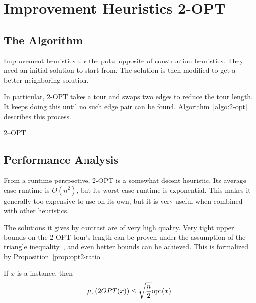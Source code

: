 \section{Improvement Heuristics 2-OPT}

\subsection{The Algorithm}

Improvement heuristics are the polar opposite of construction heuristics. They need an initial solution to start from. The solution is then modified to get a better neighboring solution.

In particular, 2-OPT takes a tour and swaps two edges to reduce the tour length. It keeps doing this until no such edge pair can be found. Algorithm~\ref{algo:2-opt} describes this process.

\begin{algorithm}
    \caption{2--OPT}
    \label{algo:2-opt}


\end{algorithm}

\subsection{Performance Analysis}

From a runtime perspective, 2-OPT is a somewhat decent heuristic. Its average case runtime is \(O(n^2)\), but its worst case runtime is exponential. This makes it generally too expensive to use on its own, but it is very useful when combined with other heuristics.

The solutions it gives by contrast are of very high quality. Very tight upper bounds on the 2-OPT tour's length can be proven under the assumption of the triangle inequality~\cite{opt2-ratio}, and even better bounds can be achieved. This is formalized by Proposition~\ref{prop:opt2-ratio}.

\begin{proposition}
    \label{prop:opt2-ratio}
    If \(x\) is a \TSP{} instance, then \[\mu_x(2OPT(x))\le \sqrt{n\over 2} \mathrm{opt}(x)\]
\end{proposition}